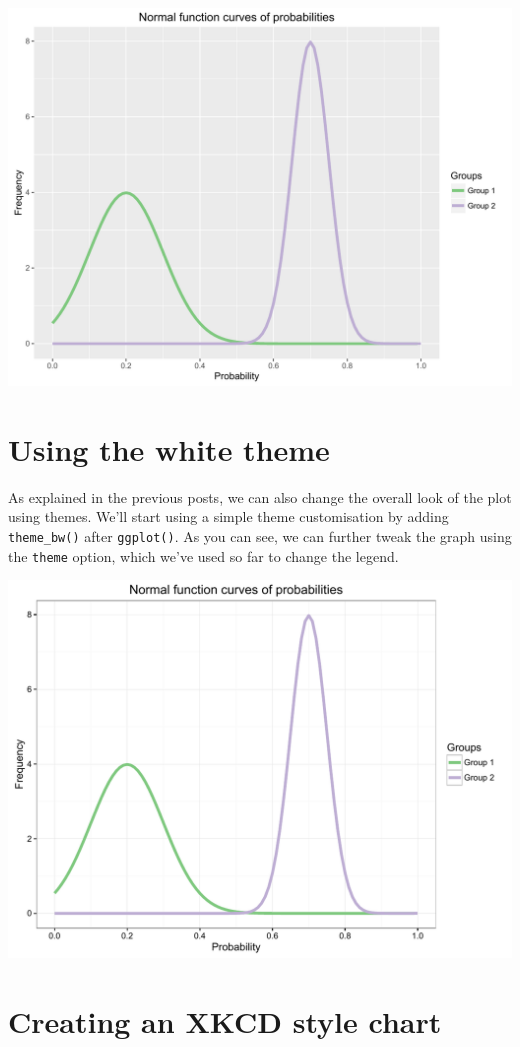 \begin{center}\includegraphics[width=0.55\linewidth]{figures/function_12-1} \end{center}

\section{Using the white theme}\label{using-the-white-theme-8}

As explained in the previous posts, we can also change the overall look
of the plot using themes. We'll start using a simple theme customisation
by adding \texttt{theme\_bw()} after \texttt{ggplot()}. As you can see,
we can further tweak the graph using the \texttt{theme} option, which
we've used so far to change the legend.

\begin{Shaded}
\begin{Highlighting}[]
\StringTok{ }\StringTok{ }\NormalTok{()}
\end{Highlighting}
\end{Shaded}

\begin{center}\includegraphics[width=0.55\linewidth]{figures/function_13-1} \end{center}

\section{Creating an XKCD style
chart}\label{creating-an-xkcd-style-chart-8}

